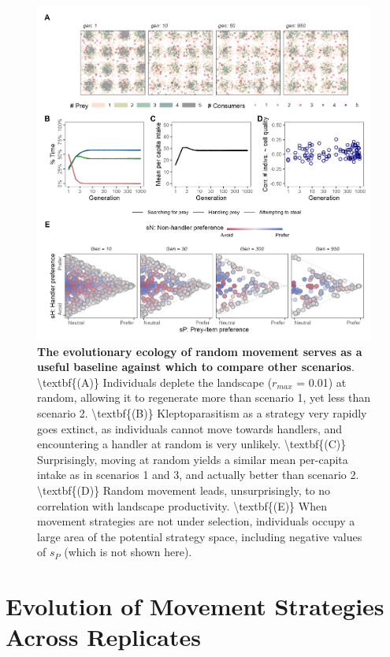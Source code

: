 \documentclass[]{article}
\begin{document}
\begin{figure}
\centering
\includegraphics{"figures/fig_0random.png"}
\caption{\textbf{The evolutionary ecology of random movement serves as a useful baseline against which to compare other scenarios}. \textbackslash{}textbf\{(A)\} Individuals deplete the landscape (\(r_{max}\) = 0.01) at random, allowing it to regenerate more than scenario 1, yet less than scenario 2. \textbackslash{}textbf\{(B)\} Kleptoparasitism as a strategy very rapidly goes extinct, as individuals cannot move towards handlers, and encountering a handler at random is very unlikely. \textbackslash{}textbf\{(C)\} Surprisingly, moving at random yields a similar mean per-capita intake as in scenarios 1 and 3, and actually better than scenario 2. \textbackslash{}textbf\{(D)\} Random movement leads, unsurprisingly, to no correlation with landscape productivity. \textbackslash{}textbf\{(E)\} When movement strategies are not under selection, individuals occupy a large area of the potential strategy space, including negative values of \(s_P\) (which is not shown here).}
\end{figure}

\newpage

\hypertarget{evolution-of-movement-strategies-across-replicates}{%
\section{Evolution of Movement Strategies Across Replicates}\label{evolution-of-movement-strategies-across-replicates}}
\end{document}
